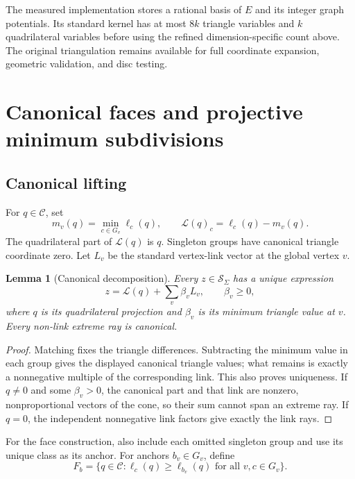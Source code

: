 \documentclass[11pt,letterpaper]{article}
\newtheorem{lemma}[theorem]{Lemma}
\theoremstyle{definition}
\theoremstyle{remark}\newtheorem{remark}[theorem]{Remark}
\newcommand{\cone}{\mathcal C}\newcommand{\stdcone}{\mathcal S}
\newcommand{\lift}{\mathcal L}
\begin{document}
The measured implementation stores a rational basis of $E$ and its
integer graph potentials. Its standard kernel has at most $8k$ triangle
variables and $k$ quadrilateral variables before using the refined
dimension-specific count above. The original triangulation remains available
for full coordinate expansion, geometric validation, and disc testing.

\section{Canonical faces and projective minimum subdivisions}
\label{sec:faces}

\subsection{Canonical lifting}

For $q\in\cone$, set
\[
 m_v(q)=\min_{c\in G_v}\ell_c(q),\qquad
 \lift(q)_c=\ell_c(q)-m_v(q).
\]
The quadrilateral part of $\lift(q)$ is $q$. Singleton groups have canonical
triangle coordinate zero. Let $L_v$ be the standard vertex-link vector at
the global vertex $v$.

\begin{lemma}[Canonical decomposition]
Every $z\in\stdcone_\Sigma$ has a unique expression
\[
 z=\lift(q)+\sum_v\beta_v L_v,\qquad\beta_v\ge0,
\]
where $q$ is its quadrilateral projection and $\beta_v$ is its minimum
triangle value at $v$. Every non-link extreme ray is canonical.
\end{lemma}

\begin{proof}
Matching fixes the triangle differences. Subtracting the minimum value in
each group gives the displayed canonical triangle values; what remains is
exactly a nonnegative multiple of the corresponding link. This also proves
uniqueness. If $q\ne0$ and some $\beta_v>0$, the canonical part and that
link are nonzero, nonproportional vectors of the cone, so their sum cannot
span an extreme ray. If $q=0$, the independent nonnegative link factors
give exactly the link rays.
\end{proof}

For the face construction, also include each omitted singleton group and
use its unique class as its anchor. For anchors $b_v\in G_v$, define
\begin{equation}
 F_b=\{q\in\cone:\ell_c(q)\ge\ell_{b_v}(q)
                         \text{ for all }v,c\in G_v\}.
 \label{eq:anchor}
\end{equation}
\end{document}
